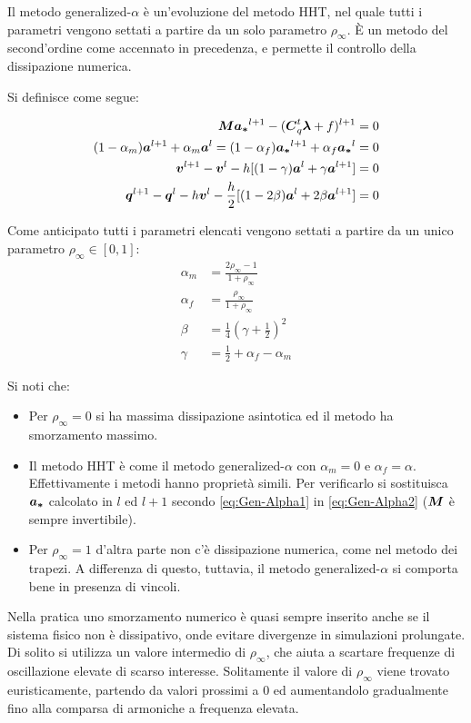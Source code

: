 Il metodo generalized-$\alpha$ \cite{generalizedAlphaHulbert93} \cite{JayNegrut2008} è un'evoluzione del metodo HHT, nel quale tutti i parametri vengono settati a partire da un solo parametro $\rho_\infty$. È un metodo del second'ordine come accennato in precedenza, e permette il controllo della dissipazione numerica.

Si definisce come segue:
 
\begin{align} \label{eq:Gen-Alpha1}
{\boldsymbol{M}}{\boldsymbol{a_*}}^{l+1}-({\boldsymbol{C}}_q^t{\boldsymbol{\lambda}}+f)^{l+1}&=0 \\ \label{eq:Gen-Alpha2}
(1-\alpha_m){\boldsymbol{a}}^{l+1}+\alpha_m{\boldsymbol{a}}^l = (1-\alpha_f){\boldsymbol{a_*}}^{l+1} + \alpha_f{\boldsymbol{a_*}}^l&=0 \\
{\boldsymbol{v}}^{l+1}-{\boldsymbol{v}}^l-h[(1-\gamma){\boldsymbol{a}}^l+\gamma{\boldsymbol{a}}^{l+1}] &=0 \\
{\boldsymbol{q}}^{l+1}-{\boldsymbol{q}}^l-h{\boldsymbol{v}}^l-\frac{h}{2}[(1-2\beta){\boldsymbol{a}}^l+2\beta{\boldsymbol{a}}^{l+1}] &=0
\end{align}

Come anticipato tutti i parametri elencati vengono settati a partire da un unico parametro $\rho_\infty \in [0,1]$:
\begin{align}
    \alpha_m &= \frac{2\rho_\infty-1}{1+\rho_\infty} \\
    \alpha_f &= \frac{\rho_\infty}{1+\rho_\infty}   \\
    \beta &= \frac{1}{4}\left(\gamma+\frac{1}{2} \right)^2 \\
    \gamma &= \frac{1}{2}+\alpha_f - \alpha_m
\end{align}

Si noti che: \begin{itemize}
    \item Per $\rho_\infty=0$ si ha massima dissipazione asintotica ed il metodo ha smorzamento massimo.
    \item Il metodo HHT è come il metodo generalized-$\alpha$ con $\alpha_m =0$ e $\alpha_f = \alpha$. Effettivamente i metodi hanno proprietà simili. Per verificarlo si sostituisca ${\boldsymbol{a_*}}$ calcolato in $l$ ed $l+1$ secondo
    \ref{eq:Gen-Alpha1} in  \ref{eq:Gen-Alpha2} (${\boldsymbol{M}}$ è sempre invertibile).
    \item Per $\rho_\infty=1$ d'altra parte non c'è dissipazione numerica, come nel metodo dei trapezi. A differenza di questo, tuttavia, il metodo generalized-$\alpha$ si comporta bene in presenza di vincoli. 
\end{itemize}
Nella pratica uno smorzamento numerico è quasi sempre inserito anche se il sistema fisico non è dissipativo, onde evitare divergenze in simulazioni prolungate. Di solito si utilizza un valore intermedio di $\rho_\infty$, che aiuta a scartare frequenze di oscillazione elevate di scarso interesse. Solitamente il valore di $\rho_\infty$ viene trovato euristicamente, partendo da valori prossimi a 0 ed aumentandolo gradualmente fino alla comparsa di armoniche a frequenza elevata.
